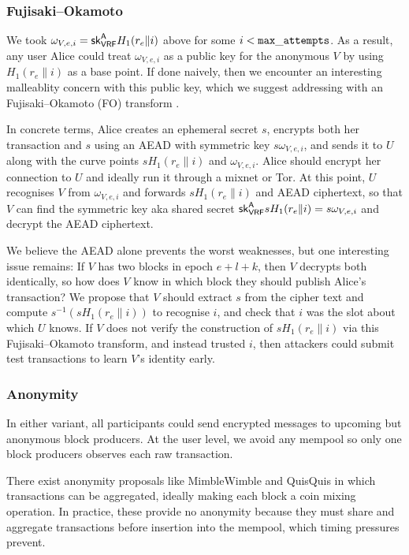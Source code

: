 \subsubsection{Fujisaki–Okamoto}

We took $\omega_{V,e,i} = \mathsf{sk}_{\mathsf{VRF}}^{\mathsf{A}} H_1(r_e \| i)$ above for some $i < \mathtt{max\_attempts}$.  As a result, any user Alice could treat $\omega_{V,e,i}$ as a public key for the anonymous $V$ by using $H_1(r_e \| i)$ as a base point.  If done naively, then we encounter an interesting malleablity concern with this public key, which we suggest addressing with an Fujisaki–Okamoto (FO) transform \cite{FO_transform}.  

In concrete terms, Alice creates an ephemeral secret $s$, encrypts both her transaction and $s$ using an AEAD with symmetric key $s \omega_{V,e,i}$, and sends it to $U$ along with the curve points $s H_1(r_e \| i)$ and $\omega_{V,e,i}$.  Alice should encrypt her connection to $U$ and ideally run it through a mixnet or Tor.  At this point, $U$ recognises $V$ from $\omega_{V,e,i}$ and forwards $s H_1(r_e \| i)$ and AEAD ciphertext, so that $V$ can find the symmetric key aka shared secret $\mathsf{sk}_{\mathsf{VRF}}^{\mathsf{A}} s H_1(r_e \| i) = s \omega_{V,e,i}$ and decrypt the AEAD ciphertext.

We believe the AEAD alone prevents the worst weaknesses, but one interesting issue remains:  If $V$ has two blocks in epoch $e+l+k$, then $V$ decrypts both identically, so how does $V$ know in which block they should publish Alice's transaction?  We propose that $V$ should extract $s$ from the cipher text and compute $s^{-1} (s H_1(r_e \| i))$ to recognise $i$, and check that $i$ was the slot about which $U$ knows.  If $V$ does not verify the construction of $s H_1(r_e \| i)$ via this Fujisaki–Okamoto transform, and instead trusted $i$, then attackers could submit test transactions to learn $V$'s identity early. 


\subsubsection{Anonymity}

In either variant, all participants could send encrypted messages to upcoming but anonymous block producers.  At the user level, we avoid any mempool so only one block producers observes each raw transaction.  

There exist anonymity proposals like MimbleWimble \cite{MimbleWimble} and QuisQuis \cite{QuisQuis} in which transactions can be aggregated, ideally making each block a coin mixing operation.  In practice, these provide no anonymity because they must share and aggregate transactions before insertion into the mempool, which timing pressures prevent.  

